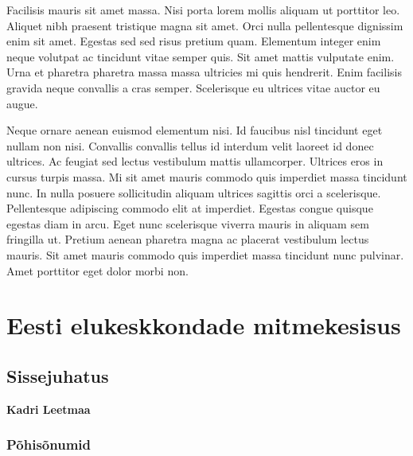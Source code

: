 \documentclass[estonian,]{article}
\begin{document}
Facilisis mauris sit amet massa. Nisi porta lorem mollis aliquam ut porttitor leo. Aliquet nibh praesent tristique magna sit amet. Orci nulla pellentesque dignissim enim sit amet. Egestas sed sed risus pretium quam. Elementum integer enim neque volutpat ac tincidunt vitae semper quis. Sit amet mattis vulputate enim. Urna et pharetra pharetra massa massa ultricies mi quis hendrerit. Enim facilisis gravida neque convallis a cras semper. Scelerisque eu ultrices vitae auctor eu augue.

Neque ornare aenean euismod elementum nisi. Id faucibus nisl tincidunt eget nullam non nisi. Convallis convallis tellus id interdum velit laoreet id donec ultrices. Ac feugiat sed lectus vestibulum mattis ullamcorper. Ultrices eros in cursus turpis massa. Mi sit amet mauris commodo quis imperdiet massa tincidunt nunc. In nulla posuere sollicitudin aliquam ultrices sagittis orci a scelerisque. Pellentesque adipiscing commodo elit at imperdiet. Egestas congue quisque egestas diam in arcu. Eget nunc scelerisque viverra mauris in aliquam sem fringilla ut. Pretium aenean pharetra magna ac placerat vestibulum lectus mauris. Sit amet mauris commodo quis imperdiet massa tincidunt nunc pulvinar. Amet porttitor eget dolor morbi non.

\hypertarget{eesti-elukeskkondade-mitmekesisus}{%
\section{Eesti elukeskkondade mitmekesisus}\label{eesti-elukeskkondade-mitmekesisus}}

\hypertarget{sissejuhatus}{%
\subsection*{Sissejuhatus}\label{sissejuhatus}}

\begin{authors}
\textbf{Kadri Leetmaa}
\end{authors}

\hypertarget{puxf5hisuxf5numid}{%
\subsubsection*{Põhisõnumid}\label{puxf5hisuxf5numid}}
\end{document}
